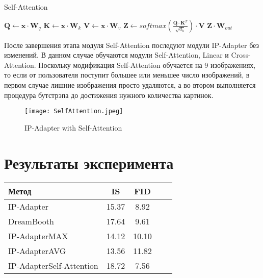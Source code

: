 \documentclass{article}
\begin{document}
\begin{algorithm}
\caption{Self-Attention}
\label{self_attention}
\begin{algorithmic}
    \State $\mathbf{Q} \gets \mathbf{x} \cdot \mathbf{W}_{q}$
    \State $\mathbf{K} \gets \mathbf{x} \cdot \mathbf{W}_{k}$
    \State $\mathbf{V} \gets \mathbf{x} \cdot \mathbf{W}_{v}$
    \State $\mathbf{Z} \gets \text{$softmax$}\left(\frac{\mathbf{Q} \cdot \mathbf{K}^T}{\sqrt{d_k}}\right) \cdot \mathbf{V}$
    \State \Return $\mathbf{Z} \cdot \mathbf{W}_{out}$
\EndProcedure
\end{algorithmic}
\end{algorithm}

После завершения этапа модуля Self-Attention последуют модули IP-Adapter без изменений. В данном случае обучаются модули Self-Attention, Linear и Cross-Attention. Поскольку модификация Self-Attention обучается на 9 изображениях, то если от пользователя поступит большее или меньшее число изображений, в первом случае лишние изображения просто удаляются, а во втором выполняется процедура бутстрэпа до достижения нужного количества картинок.


\begin{figure}[h]
    \centering
    \texttt{[image: SelfAttention.jpeg]}
    \caption{IP-Adapter with Self-Attention}
    \label{fig:self_attention}
\end{figure}


\section{Результаты эксперимента}

\begin{table}[h]
\begin{tabular}{l c c c c}
\toprule
\textbf{Метод} & \textbf{IS} & \textbf{FID}\\
\midrule
IP-Adapter & 15.37  & 8.92\\
DreamBooth & 17.64 & 9.61\\
IP-AdapterMAX & 14.12 & 10.10\\
IP-AdapterAVG & 13.56 & 11.82\\
IP-AdapterSelf-Attention & 18.72 & 7.56\\
\bottomrule
\end{tabular}
\end{table}
\end{document}
